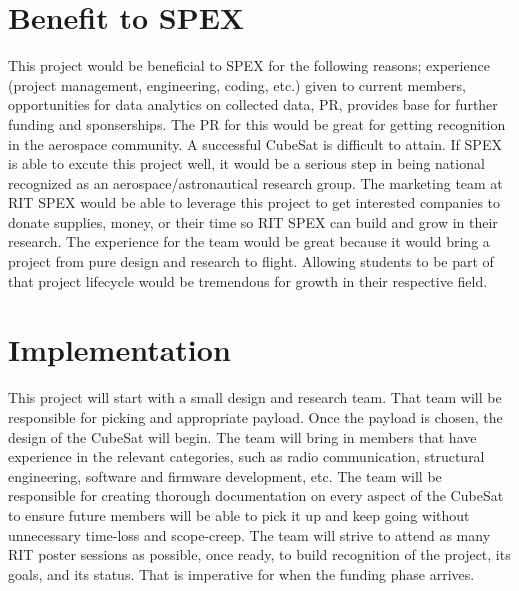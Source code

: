 \documentclass[conference]{IEEEtran} %
\begin{document}

\section{Benefit to SPEX}
\label{sec:benefit}
This project would be beneficial to SPEX for the following reasons; experience (project management, engineering, coding, etc.) given to current members, opportunities
for data analytics on collected data, PR, provides base for further funding and sponserships.
The PR for this would be great for getting recognition in the aerospace community. A successful CubeSat is
difficult to attain. If SPEX is able to excute this project well, it would be a serious step in being national recognized as an aerospace/astronautical research group.
The marketing team at RIT SPEX would be able to leverage this project to get interested companies to donate supplies, money, or their time so RIT SPEX can build
and grow in their research. The experience for the team would be great because it would bring a project from pure design and research to flight. Allowing students
to be part of that project lifecycle would be tremendous for growth in their respective field.

\section{Implementation}
\label{sec:implementation}
This project will start with a small design and research team. That team will be responsible for picking and appropriate payload. Once the payload is chosen, the
design of the CubeSat will begin. The team will bring in members that have experience in the relevant categories, such as radio communication, structural engineering,
software and firmware development, etc. The team will be responsible for creating thorough documentation on every aspect of the CubeSat to ensure future members will be able to pick it up and
keep going without unnecessary time-loss and scope-creep. The team will strive to attend as many RIT poster sessions as possible, once ready, to
build recognition of the project, its goals, and its status. That is imperative for when the funding phase arrives.
\end{document}
